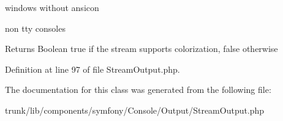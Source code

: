 \begin{DoxyItemize}
\item windows without ansicon
\item non tty consoles
\end{DoxyItemize}

\begin{DoxyReturn}{Returns}
Boolean true if the stream supports colorization, false otherwise 
\end{DoxyReturn}


Definition at line 97 of file StreamOutput.php.



The documentation for this class was generated from the following file:\begin{DoxyCompactItemize}
\item 
trunk/lib/components/symfony/Console/Output/StreamOutput.php\end{DoxyCompactItemize}
